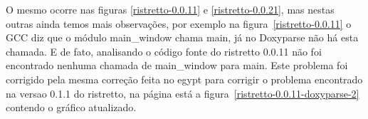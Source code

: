 O mesmo ocorre nas figuras \ref{ristretto-0.0.11} e \ref{ristretto-0.0.21}, mas
nestas outras ainda temos mais observações, por exemplo na
figura~\ref{ristretto-0.0.11} o GCC diz que o módulo main\_window chama main,
já no Doxyparse não há esta chamada. E de fato, analisando o código fonte do ristretto 0.0.11 não foi encontrado nenhuma chamada de main\_window para main. Este problema foi corrigido pela mesma correção feita no egypt para corrigir o problema encontrado na versao 0.1.1 do ristretto, na página \pageref{ristretto-0.0.11-doxyparse-2} está a figura~\ref{ristretto-0.0.11-doxyparse-2} contendo o gráfico atualizado.

\begin{figure}
\center
{}
\qquad
{}
\end{figure}
